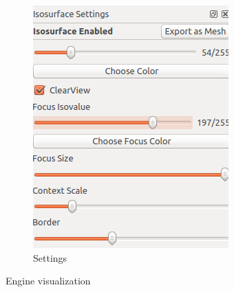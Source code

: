 \documentclass{article}
\begin{document}
\begin{figure}
\begin{subfigure}[h]{0.3\textwidth}
		\includegraphics[width=\textwidth]{engine-isosurface.png}
		\caption{Settings}
		\label{fig:settings}
	\end{subfigure}
	\caption{Engine visualization}\label{fig:4}
\end{figure}
\end{document}
